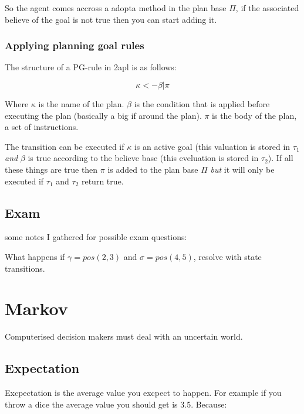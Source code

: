 \documentclass{article}
\begin{document}
\begin{prooftree}
\end{prooftree}

So the agent comes accross a adopta method in the plan base $\Pi$, if
the associated believe of the goal is not true then you can start adding
it.
\subsubsection{Applying planning goal rules}
The structure of a PG-rule in 2apl is as follows:

\[\kappa <- \beta | \pi \]

Where $\kappa$ is the name of the plan.
$\beta$ is the condition that is applied before
executing the plan (basically a big if around the plan). $\pi$ is
the body of the plan, a set of instructions.

\begin{prooftree}
\end{prooftree}

The transition can be executed if $\kappa$ is an active goal (this valuation
is stored in $\tau_1$ \emph{and} $\beta$ is true according to the believe 
base (this eveluation is stored in $\tau_2$). If all these things are true
then $\pi$ is added to the plan base $\Pi$ \emph{but} it will only be executed
if $\tau_1$ and $\tau_2$ return true.
\subsection{Exam}
some notes I gathered for possible exam questions:

What happens if $\gamma = pos(2,3)$ and $\sigma = pos(4,5)$, resolve with
state transitions.

\section{Markov}
Computerised decision makers must deal with an uncertain world.

\subsection{Expectation}
Excpectation is the average value you excpect to happen. For example if you
throw a dice the average value you should get is 3.5. Because:
\end{document}
